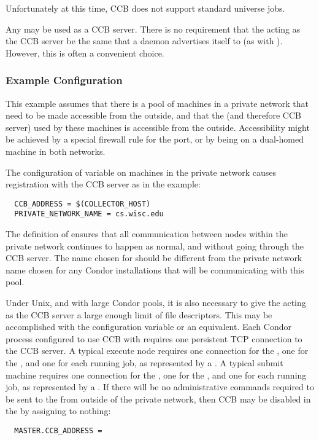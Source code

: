 Unfortunately at this time, CCB does not support standard universe jobs.

Any  may be used as a CCB server.  There is no
requirement that the  acting as the CCB server
be the same  that a daemon
advertises itself to (as with ).
However, this is often a convenient choice.

\subsubsection{Example Configuration}

This example assumes that there is a pool of machines in a private
network that need to be made accessible from the outside,
and that the  (and therefore CCB server)
used by these machines is accessible from the outside.
Accessibility might be achieved by
a special firewall rule for the  port,
or by being on a dual-homed machine in both networks.

The configuration of variable  on
machines in the private network causes registration with
the CCB server as in the example:

\begin{verbatim}
  CCB_ADDRESS = $(COLLECTOR_HOST)
  PRIVATE_NETWORK_NAME = cs.wisc.edu
\end{verbatim}

The definition of  ensures that all
communication between nodes within the private network continues to happen
as normal, and without going through the CCB server.
The name chosen for  should be different
from the private network name chosen for any Condor installations that
will be communicating with this pool.

Under Unix, and with large Condor pools,
it is also necessary to give the  acting as the CCB server
a large enough limit of file descriptors.
This may be accomplished with the configuration variable
 or an equivalent.
Each Condor process configured to use CCB with 
requires one persistent TCP connection to the CCB server.
A typical execute node
requires one connection for the ,
one for the ,
and one for each running job, as represented by a .
A typical submit machine
requires one connection for the ,
one for the ,
and one for each running job, as represented by a .
If there will be no administrative commands required
to be sent to the  from outside of
the private network, then CCB may be disabled in the 
by assigning  to nothing:
\begin{verbatim}
  MASTER.CCB_ADDRESS =
\end{verbatim}

